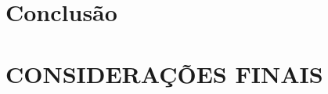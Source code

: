 \documentclass[
	12pt,				%
    oneside,			%
	a4paper,			%
	chapter=TITLE,		%
	english,			%
	brazil				%
	]{abntex2}
\begin{document}


\chapter{Conclusão}


%

\chapter{CONSIDERAÇÕES FINAIS}



\end{document}
